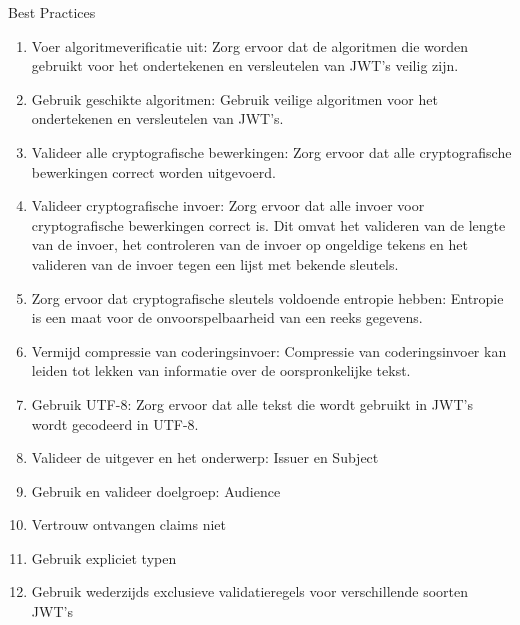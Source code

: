   Best Practices
  \begin{enumerate}[label=\textbf{-}]
    \item Voer algoritmeverificatie uit: Zorg ervoor dat de algoritmen die worden gebruikt voor het ondertekenen en versleutelen van JWT's veilig zijn.
    \item Gebruik geschikte algoritmen: Gebruik veilige algoritmen voor het ondertekenen en versleutelen van JWT's.
    \item Valideer alle cryptografische bewerkingen: Zorg ervoor dat alle cryptografische bewerkingen correct worden uitgevoerd.
    \item Valideer cryptografische invoer: Zorg ervoor dat alle invoer voor cryptografische bewerkingen correct is. Dit omvat het valideren van de lengte van de invoer, het controleren van de invoer op ongeldige tekens en het valideren van de invoer tegen een lijst met bekende sleutels.
    \item Zorg ervoor dat cryptografische sleutels voldoende entropie hebben: Entropie is een maat voor de onvoorspelbaarheid van een reeks gegevens.
    \item Vermijd compressie van coderingsinvoer: Compressie van coderingsinvoer kan leiden tot lekken van informatie over de oorspronkelijke tekst.
    \item Gebruik UTF-8: Zorg ervoor dat alle tekst die wordt gebruikt in JWT's wordt gecodeerd in UTF-8.
    \item Valideer de uitgever en het onderwerp: Issuer en Subject
    \item Gebruik en valideer doelgroep: Audience
    \item Vertrouw ontvangen claims niet
    \item Gebruik expliciet typen
    \item Gebruik wederzijds exclusieve validatieregels voor verschillende soorten JWT's
  \end{enumerate}
  \autocite{Sheffer2020}


